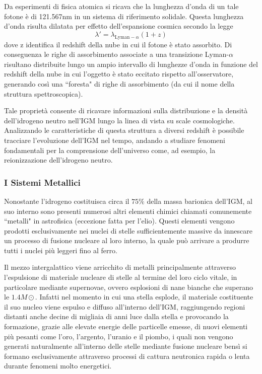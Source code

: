 \documentclass[a4paper,12pt]{article}
\begin{document}
Da esperimenti di fisica atomica si ricava che la lunghezza d'onda di un tale fotone è di 121.567nm in un sistema di riferimento solidale. Questa lunghezza d'onda risulta dilatata per effetto dell'espansione cosmica secondo la legge \[\lambda' = \lambda_{\mathrm{Lyman-}\alpha} (1+z)\] dove z identifica il redshift della nube in cui il fotone è stato assorbito. Di conseguenza le righe di assorbimento associate a una transizione Lyman-$\alpha$ risultano distribuite lungo un ampio intervallo di lunghezze d'onda in funzione del redshift della nube in cui l'oggetto è stato eccitato rispetto all'osservatore, generando così una ``foresta" di righe di assorbimento (da cui il nome della struttura spettroscopica). 

Tale proprietà consente di ricavare informazioni sulla distribuzione e la densità dell'idrogeno neutro nell'IGM  lungo la linea di vista su scale cosmologiche. Analizzando le caratteristiche di questa struttura a diversi redshift è possibile tracciare l'evoluzione dell'IGM nel tempo, andando a studiare fenomeni fondamentali per la comprensione dell'universo come, ad esempio, la reionizzazione dell'idrogeno neutro.

\subsubsection{I Sistemi Metallici}
Nonostante l'idrogeno costituisca circa il $75\%$ della massa barionica dell'IGM, al suo interno sono presenti numerosi altri elementi chimici chiamati comunemente ``metalli" in astrofisica (eccezione fatta per l'elio). Questi elementi vengono prodotti esclusivamente nei nuclei di stelle sufficientemente massive da innescare un processo di fusione nucleare al loro interno, la quale può arrivare a produrre tutti i nuclei più leggeri fino al ferro. 

Il mezzo intergalattico viene arricchito di metalli principalmente attraverso l'espulsione di materiale nucleare di stelle al termine del loro ciclo vitale, in particolare mediante supernovae, ovvero esplosioni di nane bianche che superano le $1.4 M\odot$. Infatti nel momento in cui una stella esplode, il materiale costituente il suo nucleo viene espulso e diffuso all'interno dell'IGM, raggiungendo regioni distanti anche decine di migliaia di anni luce dalla stella e provocando la formazione, grazie alle elevate energie delle particelle emesse, di nuovi elementi più pesanti come l'oro, l'argento, l'uranio e il piombo, i quali non vengono generati naturalmente all'interno delle stelle mediante fusione nucleare bensì si formano esclusivamente attraverso processi di cattura neutronica rapida o lenta durante fenomeni molto energetici.
\end{document}
